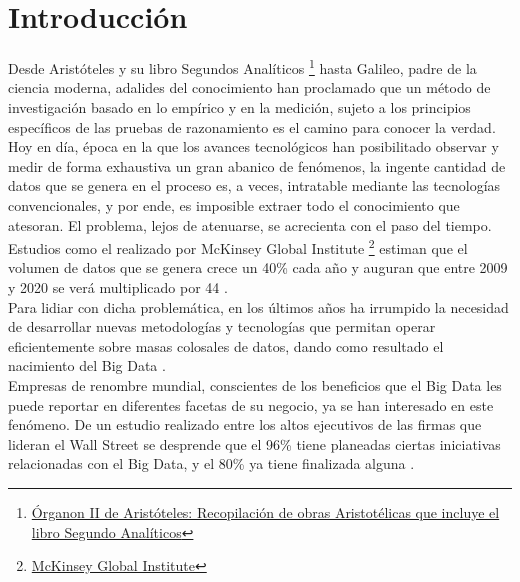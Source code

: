 
\pagestyle{fancy}

\chapter{Introducción}
\label{introduccion}

Desde Aristóteles y su libro Segundos Analíticos \footnote{\href{https://docs.google.com/a/datik.es/file/d/0By4kcbi6MzzdUHhVQnUtcTNUdk0/view}{Órganon II de Aristóteles: Recopilación de obras Aristotélicas que incluye el libro Segundo Analíticos}} hasta Galileo, padre de la ciencia moderna, adalides del conocimiento han proclamado que un método de investigación basado en lo empírico y en la medición, sujeto a los principios específicos de las pruebas de razonamiento es el camino para conocer la verdad.\\

Hoy en día, época en la que los avances tecnológicos han posibilitado observar y medir de forma exhaustiva un gran abanico de fenómenos, la ingente cantidad de datos que se genera en el proceso es, a veces, intratable mediante las tecnologías convencionales, y por ende, es imposible extraer todo el conocimiento que atesoran. El problema, lejos de atenuarse, se acrecienta con el paso del tiempo. Estudios como el realizado por McKinsey Global Institute \footnote{\href{http://www.mckinsey.com/mgi/overview}{McKinsey Global Institute}} estiman que el volumen de datos que se genera crece un 40\% cada año y auguran que entre 2009 y 2020 se verá multiplicado por 44 \cite{nambiartowards}.\\

Para lidiar con dicha problemática, en los últimos años ha irrumpido la necesidad de desarrollar nuevas metodologías y tecnologías que permitan operar eficientemente sobre masas colosales de datos, dando como resultado el nacimiento del Big Data \cite{manyika2011big}.\\

Empresas de renombre mundial, conscientes de los beneficios que el Big Data les puede reportar en diferentes facetas de su negocio, ya se han interesado en este fenómeno. De un estudio realizado entre los altos ejecutivos de las firmas que lideran el Wall Street se desprende que el 96\% tiene planeadas ciertas iniciativas relacionadas con el Big Data, y el 80\% ya tiene finalizada alguna \cite{bdes:2013}. 

